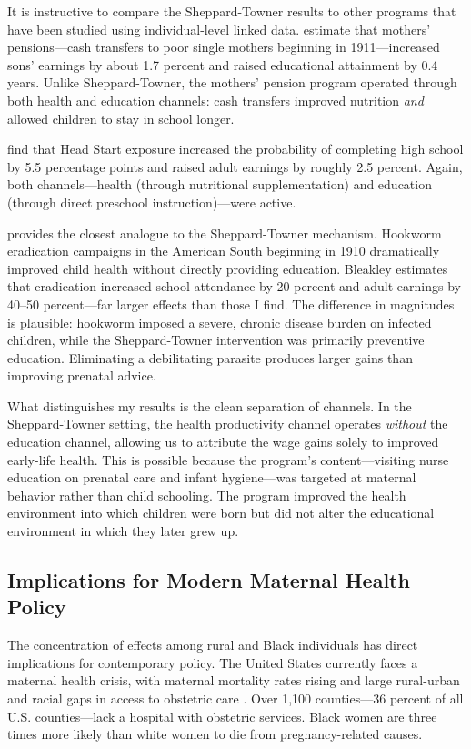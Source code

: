 \documentclass[12pt]{article}
\begin{document}
It is instructive to compare the Sheppard-Towner results to other programs that have been studied using individual-level linked data. \citet{aizerletal2016} estimate that mothers' pensions---cash transfers to poor single mothers beginning in 1911---increased sons' earnings by about 1.7 percent and raised educational attainment by 0.4 years. Unlike Sheppard-Towner, the mothers' pension program operated through both health and education channels: cash transfers improved nutrition \textit{and} allowed children to stay in school longer.

\citet{baileyetal2020} find that Head Start exposure increased the probability of completing high school by 5.5 percentage points and raised adult earnings by roughly 2.5 percent. Again, both channels---health (through nutritional supplementation) and education (through direct preschool instruction)---were active.

\citet{bleakley2007} provides the closest analogue to the Sheppard-Towner mechanism. Hookworm eradication campaigns in the American South beginning in 1910 dramatically improved child health without directly providing education. Bleakley estimates that eradication increased school attendance by 20 percent and adult earnings by 40--50 percent---far larger effects than those I find. The difference in magnitudes is plausible: hookworm imposed a severe, chronic disease burden on infected children, while the Sheppard-Towner intervention was primarily preventive education. Eliminating a debilitating parasite produces larger gains than improving prenatal advice.

What distinguishes my results is the clean separation of channels. In the Sheppard-Towner setting, the health productivity channel operates \textit{without} the education channel, allowing us to attribute the wage gains solely to improved early-life health. This is possible because the program's content---visiting nurse education on prenatal care and infant hygiene---was targeted at maternal behavior rather than child schooling. The program improved the health environment into which children were born but did not alter the educational environment in which they later grew up.

\subsection{Implications for Modern Maternal Health Policy}

The concentration of effects among rural and Black individuals has direct implications for contemporary policy. The United States currently faces a maternal health crisis, with maternal mortality rates rising and large rural-urban and racial gaps in access to obstetric care \citep{anderson2018}. Over 1,100 counties---36 percent of all U.S. counties---lack a hospital with obstetric services. Black women are three times more likely than white women to die from pregnancy-related causes.
\end{document}
